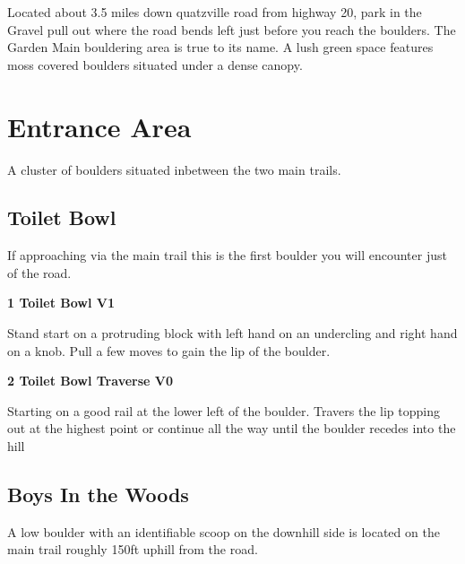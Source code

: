 \begin{multicols}{2}

Located about 3.5 miles down quatzville road from highway 20, park in the Gravel pull out where the road bends left just before you reach the boulders. The Garden Main bouldering area is true to its name. A lush green space features moss covered boulders situated under a dense canopy.

		\section{Entrance Area}\label{sa:Entrance Area}
	A cluster of boulders situated inbetween the two main trails.
			\subsection*{Toilet Bowl}\label{bf:Toilet Bowl}
			If approaching via the main trail this is the first boulder you will encounter just of the road.
			

					\label{rt:Toilet Bowl} \colorbox{green!20}{\textbf{1 Toilet Bowl V1   }}
					\begin{adjustwidth}{1cm}{}
					Stand start on a protruding block with left hand on an undercling and right hand on a knob. Pull a few moves to gain the lip of the boulder.
					\end{adjustwidth}
					\label{rt:Toilet Bowl Traverse} \colorbox{green!20}{\textbf{2 Toilet Bowl Traverse V0 \ding{72}   }}
					\begin{adjustwidth}{1cm}{}
					Starting on a good rail at the lower left of the boulder. Travers the lip topping out at the highest point or continue all the way until the boulder recedes into the hill
					\end{adjustwidth}
			\subsection*{Boys In the Woods}\label{bf:Boys In the Woods}
			A low boulder with an identifiable scoop on the downhill side is located on the main trail roughly 150ft uphill from the road.
			

\end{multicols}
